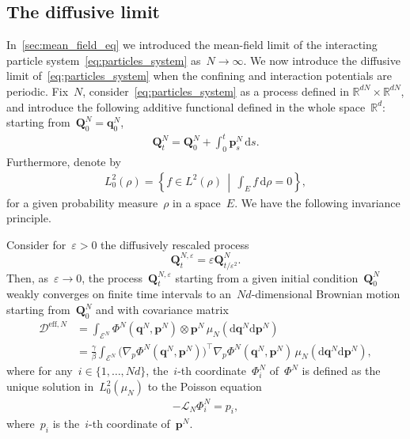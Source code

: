 \documentclass[onefignum,onetabnum]{siamart251216} %
\renewcommand{\d}{\mathrm{d}}
\newcommand{\real}{\mathbb R}
\newcommand{\mc}[1]{\mathcal{#1}}
\newcommand{\mescin}{\mu}
\newcommand{\DeffN}{\mc{D}^{\mathrm{eff},N}}
\newcommand{\eps}{\varepsilon}
\newcommand{\vP}[1]{\mathbf{p}^{#1}}
\newcommand{\vQ}[1]{\mathbf{q}^{#1}}
\theoremstyle{plain}
\numberwithin{equation}{section}
\numberwithin{theorem}{section}
\begin{document}
\subsection{The diffusive limit}
\label{sec:on_diff_lim}
In~\cref{sec:mean_field_eq} we introduced the mean-field limit of the interacting particle system~\eqref{eq:particles_system} as~$N \rightarrow \infty$. We now introduce the diffusive limit of~\eqref{eq:particles_system} when the confining and interaction potentials are periodic. Fix~$N$, consider~\eqref{eq:particles_system} as a process defined in $\real^{dN} \times \real^{dN}$, and introduce the following additive functional defined in the whole space~$\real^d$: starting from~$\textbf{Q}_0^N = \vQ{N}_0$,
\begin{align}
    \label{eq:rescaled_processN}
    \textbf{Q}_t^N = \textbf{Q}_0^N + \int_{0}^{t}\vP{N}_s\,\d s.
\end{align}
Furthermore, denote by
\begin{align}
\label{eq:centered_L2}
    L^2_0(\rho) = \left\{f \in L^2(\rho) \,\middle|\, \int_E f \, \d\rho = 0 \right\}\!,
\end{align}
for a given probability measure~$\rho$ in a space~$E$. We have the following invariance principle.
\begin{proposition}
    \label{th:diff_lim_N}
    Consider for~$\eps>0$ the diffusively rescaled process
    \[
    \textbf{Q}_t^{N,\eps} = \eps \textbf{Q}_{t/\eps^2}^N.
    \]
Then, as~$\eps \rightarrow 0$, the process~$\textbf{Q}_t^{N,\eps}$ starting from a given initial condition~$\textbf{Q}_0^N$ weakly converges on finite time intervals to an~$Nd$-dimensional Brownian motion starting from~$\textbf{Q}_0^N$ and with covariance matrix
    \begin{align}
        \label{eq:matrix_cov_N}
        \DeffN &= \int_{\mc{E}^N}\Phi^N(\vQ{N},\vP{N}) \otimes \vP{N} \, \mu_N(\d\vQ{N}\d\vP{N}) \\
        &=\frac{\gamma}{\beta} \int_{\mc{E}^N}\bigl(\nabla_p\Phi^N(\vQ{N},\vP{N})\bigr)^\top\nabla_p\Phi^N(\vQ{N},\vP{N}) \, \mu_N(\d\vQ{N}\d\vP{N}),
    \end{align}
where for any~$i \in\{1,\dots, Nd\}$, the~$i$-th coordinate~$\Phi_i^N$ of~$\Phi^N$ is defined as the unique solution in~$L^2_0(\mescin_N)$ to the Poisson equation
\begin{align}
    \label{eq:poisson_eq_coordinate}
    -\mathcal{L}_N\Phi_i^N = p_i,
\end{align}
where~$p_i$ is the~$i$-th coordinate of~$\vP{N}$.
\end{proposition}
\end{document}
